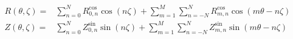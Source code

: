 \documentclass[a4paper, 12pt]{article}
\begin{document}
\begin{align*}
R(\theta, \zeta) =&                          \sum\limits_{n= 0}^{N} R_{0,n}^\mathrm{cos} \cos \left(            n \zeta \right)
                    +  \sum\limits_{m=1}^{M} \sum\limits_{n=-N}^{N} R_{m,n}^\mathrm{cos} \cos \left( m \theta - n \zeta \right) \\
Z(\theta, \zeta) =&                          \sum\limits_{n= 0}^{N} Z_{0,n}^\mathrm{sin} \sin \left(            n \zeta \right)
                    +  \sum\limits_{m=1}^{M} \sum\limits_{n=-N}^{N} Z_{m,n}^\mathrm{sin} \sin \left( m \theta - n \zeta \right)
\end{align*}
\end{document}

